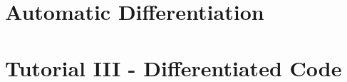 
\chapter{Automatic Differentiation}



\newpage
\chapter{Tutorial III - Differentiated Code}
\label{chap:tutorialIII}

